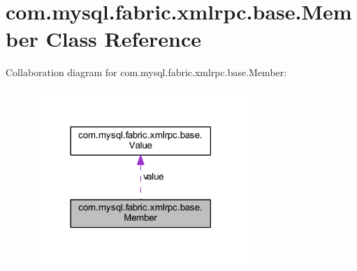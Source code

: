 \hypertarget{classcom_1_1mysql_1_1fabric_1_1xmlrpc_1_1base_1_1_member}{}\section{com.\+mysql.\+fabric.\+xmlrpc.\+base.\+Member Class Reference}
\label{classcom_1_1mysql_1_1fabric_1_1xmlrpc_1_1base_1_1_member}


Collaboration diagram for com.\+mysql.\+fabric.\+xmlrpc.\+base.\+Member\+:\nopagebreak
\begin{figure}[H]
\begin{center}
\leavevmode
\includegraphics[width=230pt]{classcom_1_1mysql_1_1fabric_1_1xmlrpc_1_1base_1_1_member__coll__graph}
\end{center}
\end{figure}
